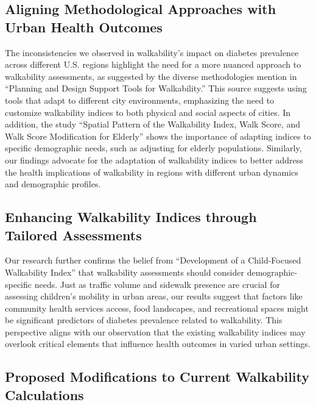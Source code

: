 \documentclass[
]{article}
\begin{document}
\subsection{Aligning Methodological Approaches with Urban Health
Outcomes}\label{aligning-methodological-approaches-with-urban-health-outcomes}

The inconsistencies we observed in walkability's impact on diabetes
prevalence across different U.S. regions highlight the need for a more
nuanced approach to walkability assessments, as suggested by the diverse
methodologies mention in ``Planning and Design Support Tools for
Walkability.'' This source suggests using tools that adapt to different
city environments, emphasizing the need to customize walkability indices
to both physical and social aspects of cities. In addition, the study
``Spatial Pattern of the Walkability Index, Walk Score, and Walk Score
Modification for Elderly'' shows the importance of adapting indices to
specific demographic needs, such as adjusting for elderly populations.
Similarly, our findings advocate for the adaptation of walkability
indices to better address the health implications of walkability in
regions with different urban dynamics and demographic profiles.

\subsection{Enhancing Walkability Indices through Tailored
Assessments}\label{enhancing-walkability-indices-through-tailored-assessments}

Our research further confirms the belief from ``Development of a
Child-Focused Walkability Index'' that walkability assessments should
consider demographic-specific needs. Just as traffic volume and sidewalk
presence are crucial for assessing children's mobility in urban areas,
our results suggest that factors like community health services access,
food landscapes, and recreational spaces might be significant predictors
of diabetes prevalence related to walkability. This perspective aligns
with our observation that the existing walkability indices may overlook
critical elements that influence health outcomes in varied urban
settings.

\subsection{Proposed Modifications to Current Walkability
Calculations}\label{proposed-modifications-to-current-walkability-calculations}
\end{document}

